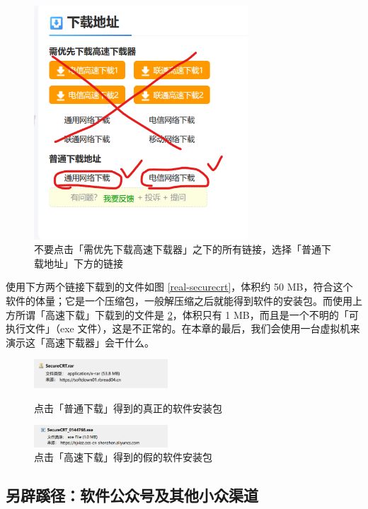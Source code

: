 \begin{figure}[H]
  \centering
  \includegraphics[width=8cm]{assets/Huajun_3.png}
  \caption{不要点击「需优先下载高速下载器」之下的所有链接，选择「普通下载地址」下方的链接}
  \label{huajun-3}
\end{figure}

使用下方两个链接下载到的文件如图 \ref{real-securecrt}，体积约 50 MB，符合这个软件的体量；它是一个压缩包，一般解压缩之后就能得到软件的安装包。而使用上方所谓「高速下载」下载到的文件是 \ref{fake-securecrt}，体积只有 1 MB，而且是一个不明的「可执行文件」（exe 文件），这是不正常的。在本章的最后，我们会使用一台虚拟机来演示这「高速下载器」会干什么。

\begin{figure}[htb!]
  \centering
  \begin{minipage}{6cm}
    \centering
    \includegraphics[width=5cm]{assets/Real_SecureCRT.png}
    \caption{点击「普通下载」得到的真正的软件安装包}
    \label{real-securecrt}
  \end{minipage}
  \qquad
  \begin{minipage}{6cm}
    \centering
    \includegraphics[width=5cm]{assets/Fake_SecureCRT.png}
    \caption{点击「高速下载」得到的假的软件安装包}
    \label{fake-securecrt}
  \end{minipage} 
\end{figure}

\subsection{另辟蹊径：软件公众号及其他小众渠道}

